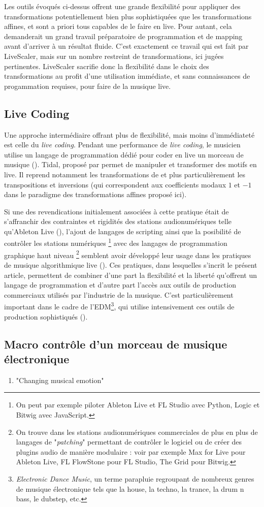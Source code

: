 Les outils évoqués ci-dessus offrent une grande flexibilité pour appliquer des transformations potentiellement bien plus sophistiquées que les transformations affines, et sont a priori tous capables de le faire en live. Pour autant, cela demanderait un grand travail préparatoire de programmation et de mapping avant d'arriver à un résultat fluide. C'est exactement ce travail qui est fait par LiveScaler, mais sur un nombre restreint de transformations, ici jugées pertinentes. LiveScaler sacrifie donc la flexibilité dans le choix des transformations au profit d'une utilisation immédiate, et sans connaissances de progammation requises, pour faire de la musique live.

\subsection{Live Coding}

Une approche intermédiaire offrant plus de flexibilité, mais moins d'immédiateté est celle du \emph{live coding}. Pendant une performance de \emph{live coding}, le musicien utilise un langage de programmation dédié pour coder en live un morceau de musique (\cite{blackwell2022live}). Tidal, proposé par \textcite{mclean2010tidal} permet de manipuler et transformer des motifs en live. Il reprend notamment les transformations de \textcite{spiegel1981manipulations} et plus particulièrement les transpositions et inversions (qui correspondent aux coefficients modaux $1$ et $-1$ dans le paradigme des transformations affines proposé ici).

Si une des revendications initialement associées à cette pratique était de s'affranchir des contraintes et rigidités des stations audionumériques telle qu'Ableton Live (\cite{collins2003live}), l'ajout de langages de scripting  ainsi que la posibilité de contrôler les stations numériques \footnote{On peut par exemple piloter  Ableton Live et FL Studio avec Python, Logic et Bitwig avec JavaScript.} avec des langages de programmation graphique haut niveau \footnote{On trouve dans les stations audionumériques commerciales de plus en plus de langages de "\emph{patching}" permettant de contrôler le logiciel ou de créer des plugins audio de manière modulaire : voir par exemple Max for Live pour Ableton Live, FL FlowStone pour FL Studio, The Grid pour Bitwig.} semblent avoir développé leur usage dans les pratiques de musique algorithmique live (\cite{collins2014algorave}). Ces pratiques, dans lesquelles s'incrit le présent article, permettent de combiner d'une part la flexibilité et la liberté qu'offrent un langage de programmation et d'autre part l'accès aux outils de production commerciaux utilisés par l'industrie de la musique. C'est particulièrement important dans le cadre de l'EDM\footnote{\emph{Electronic Dance Music}, un terme parapluie regroupant de nombreux genres de musique électronique tels que la house, la techno, la trance, la drum n bass, le dubstep, etc. }, qui utilise intensivement ces outils de production sophistiqués (\cite{fraser2012spaces}).


\subsection{Macro contrôle d'un morceau de musique électronique}
\begin{enumerate}
  \item "Changing musical emotion"
\end{enumerate}




